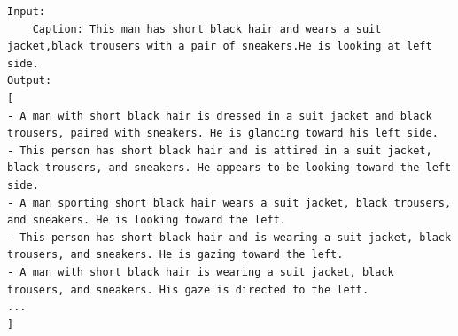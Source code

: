 \begin{minipage}[t]{0.48\textwidth}
\begin{tcolorbox}[
  title=Example,
  colback=lightgray,
  colframe=gray!70,
  fonttitle=\bfseries,
  boxrule=0.5pt,
  arc=3pt,
  top=1mm, bottom=1mm, left=1mm, right=1mm,
  sharp corners,
]

\lstset{
  basicstyle=\ttfamily,    
  breaklines=true,              
  breakatwhitespace=true,      
  columns=fullflexible,
  keepspaces=true
}

\footnotesize

\begin{lstlisting}[language=Prompt]
Input:
    Caption: This man has short black hair and wears a suit jacket,black trousers with a pair of sneakers.He is looking at left side.
Output:
[
- A man with short black hair is dressed in a suit jacket and black trousers, paired with sneakers. He is glancing toward his left side.
- This person has short black hair and is attired in a suit jacket, black trousers, and sneakers. He appears to be looking toward the left side.
- A man sporting short black hair wears a suit jacket, black trousers, and sneakers. He is looking toward the left.
- This person has short black hair and is wearing a suit jacket, black trousers, and sneakers. He is gazing toward the left.
- A man with short black hair is wearing a suit jacket, black trousers, and sneakers. His gaze is directed to the left.
...
]
    

\end{lstlisting}

\end{tcolorbox}
\end{minipage}